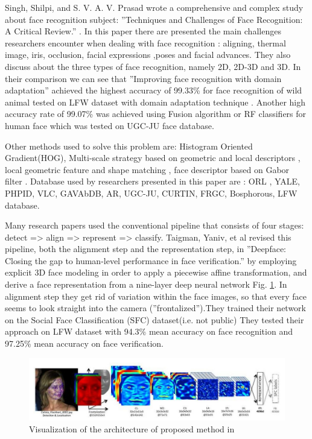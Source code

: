 \documentclass[runningheads,a4paper,11pt]{report}
\begin{document}
    Singh, Shilpi, and S. V. A. V. Prasad wrote a comprehensive and complex study about face recognition subject: ''Techniques and Challenges of Face Recognition: A Critical Review.''\cite{singh2018techniques} . In this paper there are presented the main challenges researchers encounter when dealing with face recognition : aligning, thermal image, iris, occlusion, facial expressions ,poses and facial advances. They also discuss about the three types of face recognition, namely 2D, 2D-3D and 3D. In their comparison we can see that ''Improving face recognition with domain adaptation'' \cite{wen2018improving} achieved the highest accuracy of 99.33\% for face recognition of wild animal tested on LFW dataset with domain adaptation technique . Another high accuracy rate of 99.07\%  was achieved using Fusion algorithm \cite{seal2016human} or RF classifiers for human face which was tested on UGC-JU face database.

    Other methods used to solve this problem are: Histogram Oriented Gradient(HOG)\cite{fathi2016new}, Multi-scale strategy based on geometric and local descriptors \cite{zhou2018pose}, local geometric feature and shape matching \cite{guo2016ei3d}, face descriptor based on Gabor filter \cite{aksasse2017novel}. Database used by researchers presented in this paper are : ORL , YALE, PHPID, VLC, GAVAbDB, AR, UGC-JU, CURTIN, FRGC, Bosphorous, LFW database.

    Many research papers used the conventional pipeline that consists of four stages: detect => align => represent => classify. Taigman, Yaniv, et al revised this pipeline, both the alignment step and the representation step, in ''Deepface: Closing the gap to human-level performance in face verification.'' \cite{taigman2014deepface}  by employing explicit 3D face modeling in order to apply a piecewise affine transformation, and derive a face representation from a nine-layer deep neural network Fig. \ref{img1}. In alignment step they get rid of variation within the face images, so that every face seems to look straight into the camera (''frontalized'').They trained their network on the Social Face Classification (SFC) dataset(i.e. not public) They tested their approach on LFW dataset with 94.3\% mean accuracy on face recognition and 97.25\% mean accuracy on face verification.

    \begin{figure}[!htb]
        \centering
        \includegraphics[scale=0.45]{Figures/img1.jpg}
        \caption{Visualization of the architecture of proposed method in \cite{taigman2014deepface}}
        \label{img1}
    \end{figure}
\end{document}
